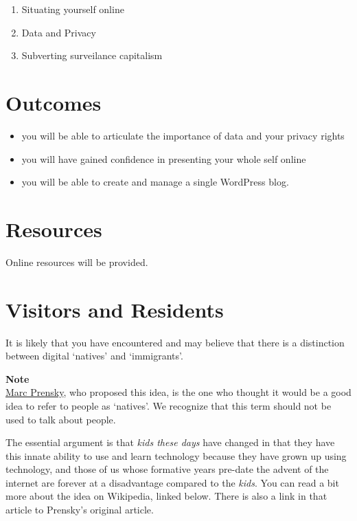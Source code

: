 \documentclass[
]{book}
\providecommand{\tightlist}{%
  \setlength{\itemsep}{0pt}\setlength{\parskip}{0pt}}
\begin{document}
\begin{enumerate}
\def\labelenumi{\arabic{enumi}.}
\tightlist
\item
  Situating yourself online
\item
  Data and Privacy
\item
  Subverting surveilance capitalism
\end{enumerate}

\hypertarget{outcomes}{%
\section*{Outcomes}\label{outcomes}}

\begin{itemize}
\tightlist
\item
  you will be able to articulate the importance of data and your privacy rights
\item
  you will have gained confidence in presenting your whole self online
\item
  you will be able to create and manage a single WordPress blog.
\end{itemize}

\hypertarget{resources-1}{%
\section*{Resources}\label{resources-1}}

Online resources will be provided.

\hypertarget{visitors-and-residents}{%
\section{Visitors and Residents}\label{visitors-and-residents}}

It is likely that you have encountered and may believe that there is a distinction between digital `natives' and `immigrants'.

\begin{caution}
\textbf{Note}\\
\href{https://marcprensky.com/}{Marc Prensky}, who proposed this idea,
is the one who thought it would be a good idea to refer to people as
`natives'. We recognize that this term should not be used to talk about
people.
\end{caution}

The essential argument is that \emph{kids these days} have changed in that they have this innate ability to use and learn technology because they have grown up using technology, and those of us whose formative years pre-date the advent of the internet are forever at a disadvantage compared to the \emph{kids}. You can read a bit more about the idea on Wikipedia, linked below. There is also a link in that article to Prensky's original article.
\end{document}
